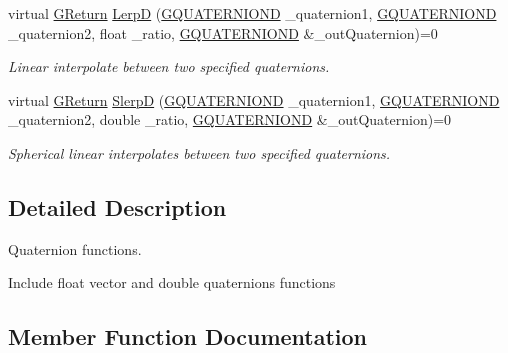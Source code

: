 \begin{DoxyCompactItemize}
virtual \mbox{\hyperlink{namespaceGW_a67a839e3df7ea8a5c5686613a7a3de21}{G\+Return}} \mbox{\hyperlink{classGW_1_1MATH_1_1GQuaternion_a8babbec6378f12ecd2b7ae5d6e1b64fa}{LerpD}} (\mbox{\hyperlink{structGW_1_1MATH_1_1GQUATERNIOND}{G\+Q\+U\+A\+T\+E\+R\+N\+I\+O\+ND}} \+\_\+quaternion1, \mbox{\hyperlink{structGW_1_1MATH_1_1GQUATERNIOND}{G\+Q\+U\+A\+T\+E\+R\+N\+I\+O\+ND}} \+\_\+quaternion2, float \+\_\+ratio, \mbox{\hyperlink{structGW_1_1MATH_1_1GQUATERNIOND}{G\+Q\+U\+A\+T\+E\+R\+N\+I\+O\+ND}} \&\+\_\+out\+Quaternion)=0
\begin{DoxyCompactList}\small\item\em Linear interpolate between two specified quaternions. \end{DoxyCompactList}\item 
virtual \mbox{\hyperlink{namespaceGW_a67a839e3df7ea8a5c5686613a7a3de21}{G\+Return}} \mbox{\hyperlink{classGW_1_1MATH_1_1GQuaternion_abbec9491d2503355f9254930cd34dd2b}{SlerpD}} (\mbox{\hyperlink{structGW_1_1MATH_1_1GQUATERNIOND}{G\+Q\+U\+A\+T\+E\+R\+N\+I\+O\+ND}} \+\_\+quaternion1, \mbox{\hyperlink{structGW_1_1MATH_1_1GQUATERNIOND}{G\+Q\+U\+A\+T\+E\+R\+N\+I\+O\+ND}} \+\_\+quaternion2, double \+\_\+ratio, \mbox{\hyperlink{structGW_1_1MATH_1_1GQUATERNIOND}{G\+Q\+U\+A\+T\+E\+R\+N\+I\+O\+ND}} \&\+\_\+out\+Quaternion)=0
\begin{DoxyCompactList}\small\item\em Spherical linear interpolates between two specified quaternions. \end{DoxyCompactList}\end{DoxyCompactItemize}


\subsection{Detailed Description}
Quaternion functions. 

Include float vector and double quaternion\textquotesingle{}s functions 

\subsection{Member Function Documentation}
\mbox{\label{classGW_1_1MATH_1_1GQuaternion_a7b2b661a82bd6370567ab2a31c463cea}} 
